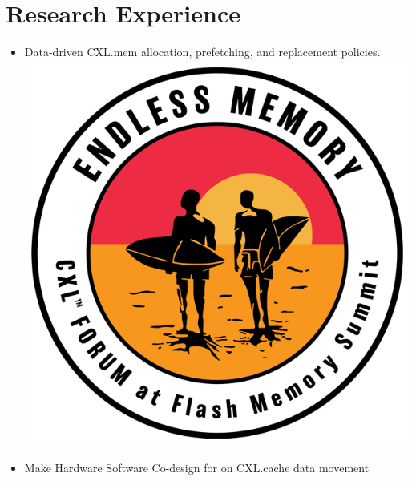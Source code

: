 \documentclass{resume}
\newcommand{\en}[1]{#1}
\newcommand{\zh}[1]{}
\begin{document}
\section{\en{Research Experience}\zh{研究经历}}

\en{}
\zh{\datedsubsection{\textbf{\href{https://www.ssrc.ucsc.edu/index.html}{加州大学圣克鲁兹分校存储中心}}}{08/2022 -- 现在}}
\en{}
\zh{\role{研究生科研}{助理}}
\begin{itemize}
      \item \small{ \en{Data-driven CXL.mem allocation, prefetching, and replacement policies. } \zh{理解CXL.mem的性能分析。数据驱动的远端内存分配、预取和替换策略。}}\includegraphics[width=\linewidth/40]{cxl.png}
      \item \small{ \en{Make Hardware Software Co-design for on CXL.cache data movement}
}
\end{itemize}
\end{document}
